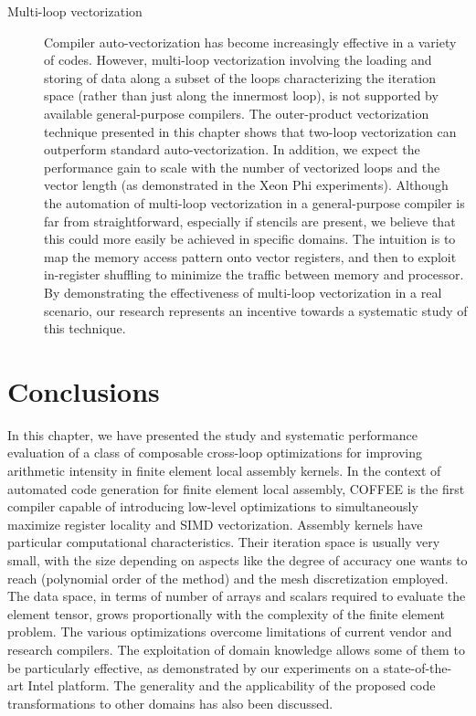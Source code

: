 \begin{description}
\item[Multi-loop vectorization] Compiler auto-vectorization has become increasingly effective in a variety of codes. However, multi-loop vectorization involving the loading and storing of data along a subset of the loops characterizing the iteration space (rather than just along the innermost loop), is not supported by available general-purpose compilers. The outer-product vectorization technique presented in this chapter shows that two-loop vectorization can outperform standard auto-vectorization. In addition, we expect the performance gain to scale with the number of vectorized loops and the vector length (as demonstrated in  the Xeon Phi experiments). Although the automation of multi-loop vectorization in a general-purpose compiler is far from straightforward, especially if stencils are present, we believe that this could more easily be achieved in specific domains. The intuition is to map the memory access pattern onto vector registers, and then to exploit in-register shuffling to minimize the traffic between memory and processor. By demonstrating the effectiveness of multi-loop vectorization in a real scenario, our research represents an incentive towards a systematic study of this technique.
\end{description}

\section{Conclusions}
\label{sec:coffee-conclusion}
In this chapter, we have presented the study and systematic performance evaluation of a class of composable cross-loop optimizations for improving arithmetic intensity in finite element local assembly kernels. In the context of automated code generation for finite element local assembly, COFFEE is the first compiler capable of introducing low-level optimizations to simultaneously maximize register locality and SIMD vectorization. Assembly kernels have particular computational characteristics. Their iteration space is usually very small, with the size depending on aspects like the degree of accuracy one wants to reach (polynomial order of the method) and the mesh discretization employed. The data space, in terms of number of arrays and scalars required to evaluate the element tensor, grows proportionally with the complexity of the finite element problem. The various optimizations overcome limitations of current vendor and research compilers. The exploitation of domain knowledge allows some of them to be particularly effective, as demonstrated by our experiments on a state-of-the-art Intel platform. The generality and the applicability of the proposed code transformations to other domains has also been discussed.
